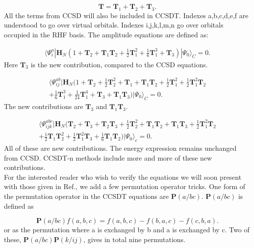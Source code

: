 \documentclass[a4paper,norsk,11pt,twoside]{report}
\begin{document}
\begin{equation}
\textbf{T} = \textbf{T}_1 + \textbf{T}_2 + \textbf{T}_3 .
\end{equation}
All the terms from CCSD will also be included in CCSDT. Indexes a,b,c,d,e,f are understood to go over virtual orbitals. Indexes i,j,k,l,m,n go over orbitals occupied in the RHF basis. The amplitude equations are defined as:

\begin{align}
\langle \Psi_i^a | \textbf{H}_N (1 + \textbf{T}_2 + \textbf{T}_1 \textbf{T}_2 + \frac{1}{2} \textbf{T}_1^2 + \frac{1}{6} \textbf{T}_1^3 + \textbf{T}_3) | \Psi_0 \rangle_C = 0.
\end{align}
Here $\textbf{T}_3$ is the new contribution, compared to the CCSD equations.

\begin{align}
\langle \Psi_{ij}^{ab} | \textbf{H}_N (
1 + \textbf{T}_2 + \frac{1}{2} \textbf{T}_2^2
+ \textbf{T}_1 + \textbf{T}_1 \textbf{T}_2 + \frac{1}{2} \textbf{T}_1^2 
+ \frac{1}{2} \textbf{T}_1^2 \textbf{T}_2 \nonumber \\
+ \frac{1}{6} \textbf{T}_1^3 + \frac{1}{24} \textbf{T}_1^4 + \textbf{T}_3 + \textbf{T}_1 \textbf{T}_3) | \Psi_0 \rangle_C = 0.
\end{align}
The new contributions are $\textbf{T}_3$ and $\textbf{T}_1 \textbf{T}_3$. 

\begin{align}
\langle \Psi_{ijk}^{abc} | \textbf{H}_N (
\textbf{T}_2 + \textbf{T}_3 + \textbf{T}_2 \textbf{T}_3 + \frac{1}{2} \textbf{T}_2^2
+ \textbf{T}_1 \textbf{T}_2 + \textbf{T}_1 \textbf{T}_3 + \frac{1}{2} \textbf{T}_1^2 \textbf{T}_2 
\nonumber \\
+ \frac{1}{2} \textbf{T}_1 \textbf{T}_2^2 + \frac{1}{2} \textbf{T}_1^2 \textbf{T}_3 + \frac{1}{6} \textbf{T}_1 \textbf{T}_2) | \Psi_0 \rangle_c = 0.
\end{align}
All of these are new contributions. The energy expression remains unchanged from CCSD. CCSDT-n methods include more and more of these new contributions. \\

For the interested reader who wish to verify the equations we will soon present with those given in Ref.\cite{CCSDT-ref4}, we add a few permutation operator tricks. One form of the permutation operator in the CCSDT equations are $\textbf{P}(a/bc)$. $\textbf{P}(a/bc)$ is defined as

\begin{equation}
\textbf{P}(a/bc) f(a,b,c) = f(a,b,c) - f(b,a,c) - f(c,b,a) .
\end{equation}
or as the permutation where a is exchanged by b and a is exchanged by c. Two of these,  $\textbf{P}(a/bc) \textbf{P}(k/ij)$, gives in total nine permutations. \\
\end{document}

